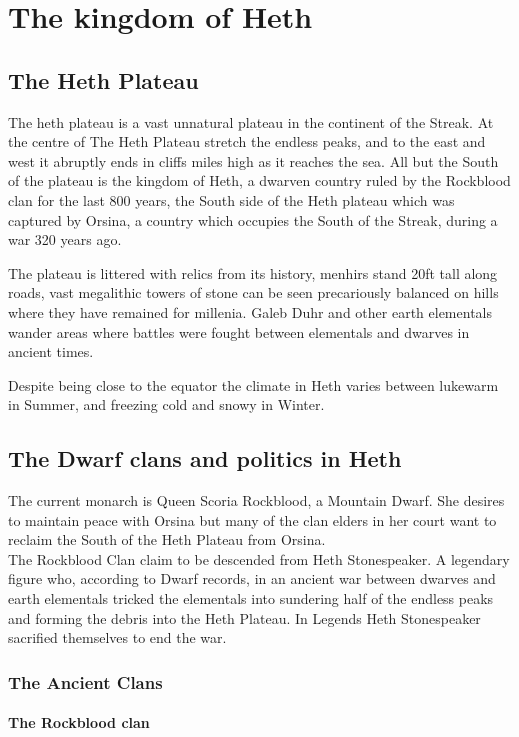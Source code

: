 \documentclass[10pt,twoside,twocolumn,openany,justified,bg=full,nomultitoc]{dndbook}
\begin{document}
\chapter{The kingdom of Heth}
\label{sec-2}
\section{The Heth Plateau}
\label{sec-2-1}
The heth plateau is a vast unnatural plateau in the continent of the Streak. At the centre of The Heth Plateau stretch the endless peaks, and to the east and west it abruptly ends in cliffs miles high as it reaches the sea. All but the South of the plateau is the kingdom of Heth, a dwarven country ruled by the Rockblood clan for the last 800 years, the South side of the Heth plateau which was captured by Orsina, a country which occupies the South of the Streak, during a war 320 years ago. 

The plateau is littered with relics from its history, menhirs stand 20ft tall along roads, vast megalithic towers of stone can be seen precariously balanced on hills where they have remained for millenia. Galeb Duhr and other earth elementals wander areas where battles were fought between elementals and dwarves in ancient times.

Despite being close to the equator the climate in Heth varies between lukewarm in Summer, and freezing cold and snowy in Winter. 

\section{The Dwarf clans and politics in Heth}
\label{sec-2-2}
The current monarch is Queen Scoria Rockblood, a Mountain Dwarf. She desires to maintain peace with Orsina but many of the clan elders in her court want to reclaim the South of the Heth Plateau from Orsina.\\

The Rockblood Clan claim to be descended from Heth Stonespeaker. A legendary figure who, according to Dwarf records, in an ancient war between dwarves and earth elementals tricked the elementals into sundering half of the endless peaks and forming the debris into the Heth Plateau. In Legends Heth Stonespeaker sacrified themselves to end the war. 

\subsection{The Ancient Clans}
\label{sec-2-2-1}
\subsubsection{The Rockblood clan}
\label{sec-2-2-1-1}
\end{document}
